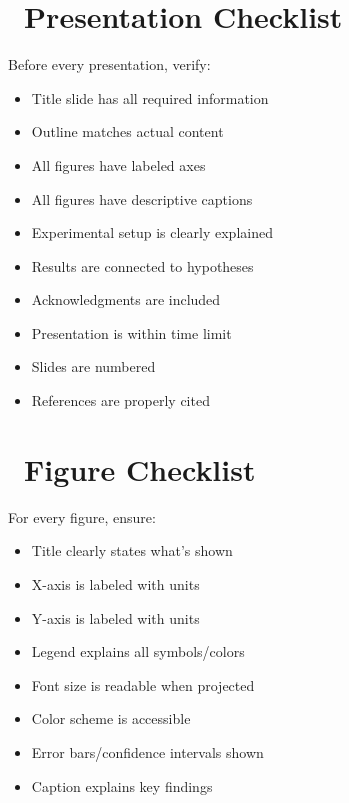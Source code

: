 \documentclass[11pt,a4paper]{article}
\begin{document}
\appendix

\newpage

\section{\faCheckCircle~Presentation Checklist}

Before every presentation, verify:

\begin{itemize}
    \item[$\Box$] Title slide has all required information
    \item[$\Box$] Outline matches actual content
    \item[$\Box$] All figures have labeled axes
    \item[$\Box$] All figures have descriptive captions
    \item[$\Box$] Experimental setup is clearly explained
    \item[$\Box$] Results are connected to hypotheses
    \item[$\Box$] Acknowledgments are included
    \item[$\Box$] Presentation is within time limit
    \item[$\Box$] Slides are numbered
    \item[$\Box$] References are properly cited
\end{itemize}

\section{\faImage~Figure Checklist}

For every figure, ensure:

\begin{itemize}
    \item[$\Box$] Title clearly states what's shown
    \item[$\Box$] X-axis is labeled with units
    \item[$\Box$] Y-axis is labeled with units
    \item[$\Box$] Legend explains all symbols/colors
    \item[$\Box$] Font size is readable when projected
    \item[$\Box$] Color scheme is accessible
    \item[$\Box$] Error bars/confidence intervals shown
    \item[$\Box$] Caption explains key findings
\end{itemize}
\end{document}
